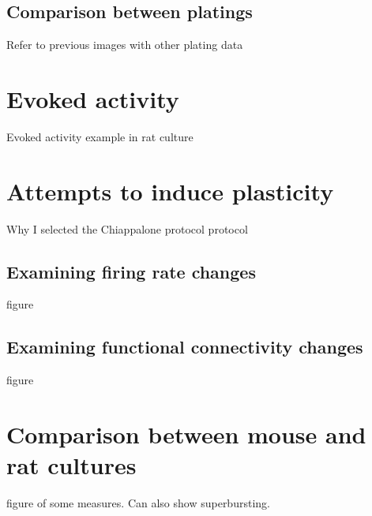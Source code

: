         \subsection{Comparison between platings}
        Refer to previous images with other plating data
    \section{Evoked activity}
    Evoked activity example in rat culture
    \section{Attempts to induce plasticity}
    Why I selected the Chiappalone  protocol protocol
        \subsection{Examining firing rate changes}
        figure
        \subsection{Examining functional connectivity changes}
        figure
    \section{Comparison between mouse and rat cultures}
    figure of some measures. Can also show superbursting.


